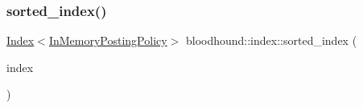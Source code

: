 \subsubsection{\texorpdfstring{sorted\+\_\+index()}{sorted\_index()}}
{\footnotesize\ttfamily \hyperlink{classbloodhound_1_1index_1_1Index}{Index}$<$\hyperlink{classbloodhound_1_1index_1_1InMemoryPostingPolicy}{In\+Memory\+Posting\+Policy}$>$ bloodhound\+::index\+::sorted\+\_\+index (\begin{DoxyParamCaption}\item[{const \hyperlink{classbloodhound_1_1index_1_1Index}{Index}$<$ \hyperlink{classbloodhound_1_1index_1_1InMemoryPostingPolicy}{In\+Memory\+Posting\+Policy} $>$ \&}]{index }\end{DoxyParamCaption})}

